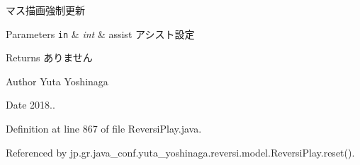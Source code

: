 マス描画強制更新 


\begin{DoxyParams}[1]{Parameters}
\mbox{\tt in}  & {\em int} & assist アシスト設定 \\
\hline
\end{DoxyParams}
\begin{DoxyReturn}{Returns}
ありません 
\end{DoxyReturn}
\begin{DoxyAuthor}{Author}
Yuta Yoshinaga 
\end{DoxyAuthor}
\begin{DoxyDate}{Date}
2018.. 
\end{DoxyDate}


Definition at line 867 of file Reversi\+Play.\+java.



Referenced by jp.\+gr.\+java\+\_\+conf.\+yuta\+\_\+yoshinaga.\+reversi.\+model.\+Reversi\+Play.\+reset().

